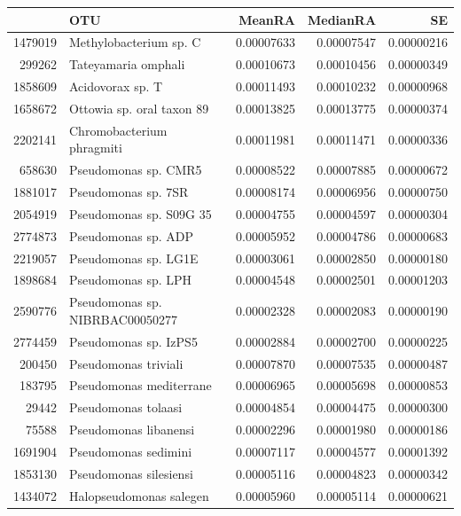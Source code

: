 \begin{table}[ht]
\centering
\begin{tabular}{rlrrr}
  \hline
 & OTU & MeanRA & MedianRA & SE \\ 
  \hline
1479019 & Methylobacterium sp. C & 0.00007633 & 0.00007547 & 0.00000216 \\ 
  299262 & Tateyamaria omphali & 0.00010673 & 0.00010456 & 0.00000349 \\ 
  1858609 & Acidovorax sp. T & 0.00011493 & 0.00010232 & 0.00000968 \\ 
  1658672 & Ottowia sp. oral taxon 89 & 0.00013825 & 0.00013775 & 0.00000374 \\ 
  2202141 & Chromobacterium phragmiti & 0.00011981 & 0.00011471 & 0.00000336 \\ 
  658630 & Pseudomonas sp. CMR5 & 0.00008522 & 0.00007885 & 0.00000672 \\ 
  1881017 & Pseudomonas sp. 7SR & 0.00008174 & 0.00006956 & 0.00000750 \\ 
  2054919 & Pseudomonas sp. S09G 35 & 0.00004755 & 0.00004597 & 0.00000304 \\ 
  2774873 & Pseudomonas sp. ADP & 0.00005952 & 0.00004786 & 0.00000683 \\ 
  2219057 & Pseudomonas sp. LG1E & 0.00003061 & 0.00002850 & 0.00000180 \\ 
  1898684 & Pseudomonas sp. LPH & 0.00004548 & 0.00002501 & 0.00001203 \\ 
  2590776 & Pseudomonas sp. NIBRBAC00050277 & 0.00002328 & 0.00002083 & 0.00000190 \\ 
  2774459 & Pseudomonas sp. IzPS5 & 0.00002884 & 0.00002700 & 0.00000225 \\ 
  200450 & Pseudomonas triviali & 0.00007870 & 0.00007535 & 0.00000487 \\ 
  183795 & Pseudomonas mediterrane & 0.00006965 & 0.00005698 & 0.00000853 \\ 
  29442 & Pseudomonas tolaasi & 0.00004854 & 0.00004475 & 0.00000300 \\ 
  75588 & Pseudomonas libanensi & 0.00002296 & 0.00001980 & 0.00000186 \\ 
  1691904 & Pseudomonas sedimini & 0.00007117 & 0.00004577 & 0.00001392 \\ 
  1853130 & Pseudomonas silesiensi & 0.00005116 & 0.00004823 & 0.00000342 \\ 
  1434072 & Halopseudomonas salegen & 0.00005960 & 0.00005114 & 0.00000621 \\ 

\end{tabular}
\end{table}
